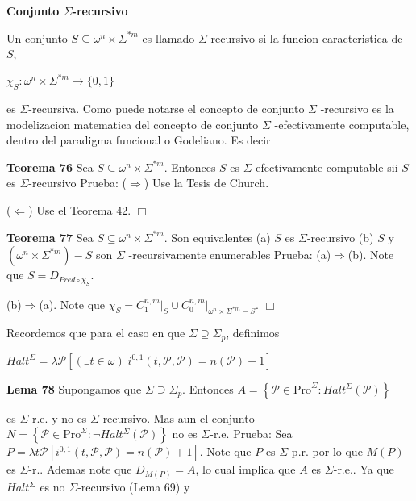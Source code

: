 \textbf{Conjunto \(\Sigma \)-recursivo}

Un conjunto \(S\subseteq \omega ^{n}\times \Sigma ^{\ast m}\) es llamado \( \Sigma \)-recursivo si la funcion caracteristica de \(S\),

\(\displaystyle \chi _{S}:\omega ^{n}\times \Sigma ^{\ast m}\rightarrow \{0,1\} \)

es \(\Sigma \)-recursiva. Como puede notarse el concepto de conjunto \(\Sigma \) -recursivo es la modelizacion matematica del concepto de conjunto \(\Sigma \) -efectivamente computable, dentro del paradigma funcional o Godeliano. Es decir



\textbf{Teorema 76} Sea \(S\subseteq \omega ^{n}\times \Sigma ^{\ast m}\). Entonces \(S\) es \(\Sigma \)-efectivamente computable sii \(S\) es \(\Sigma \)-recursivo
Prueba: (\(\Rightarrow \)) Use la Tesis de Church.

(\(\Leftarrow \)) Use el Teorema 42. \(\Box\)




\textbf{Teorema 77} Sea \(S\subseteq \omega ^{n}\times \Sigma ^{\ast m}.\) Son equivalentes
(a) \(S\) es \(\Sigma \)-recursivo
(b) \(S\) y \((\omega ^{n}\times \Sigma ^{\ast m})-S\) son \(\Sigma \) -recursivamente enumerables
Prueba: (a)\(\Rightarrow \)(b)\(.\) Note que \(S=D_{Pred\circ \chi _{S}}.\)

(b)\(\Rightarrow \)(a). Note que \(\chi _{S}=C_{1}^{n,m}\mathrm{\mid }_{S}\cup C_{0}^{n,m}\mathrm{\mid }_{\omega ^{n}\times \Sigma ^{\ast m}-S}\). \(\Box\)

Recordemos que para el caso en que \(\Sigma \supseteq \Sigma _{p}\), definimos

\(\displaystyle Halt^{\Sigma }=\lambda \mathcal{P}\left[ (\exists t\in \omega )\;i^{0,1}(t, \mathcal{P},\mathcal{P})=n(\mathcal{P})+1\right] \)





\textbf{Lema 78} Supongamos que \(\Sigma \supseteq \Sigma _{p}.\) Entonces
\(\displaystyle A=\left\{ \mathcal{P}\in \mathrm{Pro}^{\Sigma }:Halt^{\Sigma }(\mathcal{P} )\right\} \)

es \(\Sigma \)-r.e. y no es \(\Sigma \)-recursivo. Mas aun el conjunto
\(\displaystyle N=\left\{ \mathcal{P}\in \mathrm{Pro}^{\Sigma }:\lnot Halt^{\Sigma }( \mathcal{P})\right\} \)
no es \(\Sigma \)-r.e.
Prueba: Sea \(P=\lambda t\mathcal{P}\left[ i^{0,1}(t,\mathcal{P},\mathcal{P})=n( \mathcal{P})+1\right] \). Note que \(P\) es \(\Sigma \)-p.r. por lo que \(M(P)\) es \(\Sigma \)-r.. Ademas note que \(D_{M(P)}=A\), lo cual implica que \(A\) es \( \Sigma \)-r.e.. Ya que \(Halt^{\Sigma }\) es no \(\Sigma \)-recursivo (Lema 69) y

